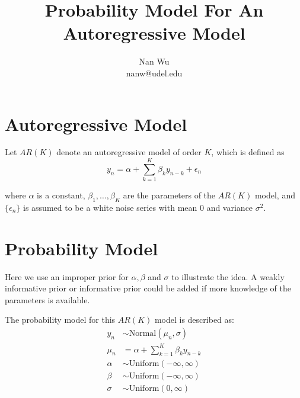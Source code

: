 \documentclass[12pt]{article}
\begin{document}
\title{Probability Model For An Autoregressive Model}
\author{Nan Wu \\ nanw@udel.edu}
\date{}
\maketitle

\section{Autoregressive Model}

Let $AR(K)$ denote an autoregressive model of order $K$, which is defined as
\begin{equation}
y_n = \alpha + \sum \limits_{k=1}^K \beta_k y_{n-k} + \epsilon_n
\end{equation}

where $\alpha$ is a constant, $\beta_1, \ldots, \beta_K$ are the parameters of the $AR(K)$ model, and $\{\epsilon_n\}$ is assumed to be a white noise series with mean $0$ and variance $\sigma^2$.

\section{Probability Model}

Here we use an improper prior for $\alpha, \beta$ and $\sigma$ to illustrate the idea. A weakly informative prior or informative prior could be added if more knowledge of the parameters is available.

The probability model for this $AR(K)$ model is described as:
\begin{align*}
y_n &\sim \mathrm{Normal}\left( \mu_n, \sigma \right) \\
\mu_n &= \alpha + \sum \limits_{k=1}^K \beta_k y_{n-k} \\
\alpha &\sim \mathrm{Uniform}\left( -\infty,\infty \right) \\
\beta &\sim \mathrm{Uniform}\left( -\infty,\infty \right) \\
\sigma &\sim \mathrm{Uniform}\left( 0,\infty \right)
\end{align*}
\end{document}
